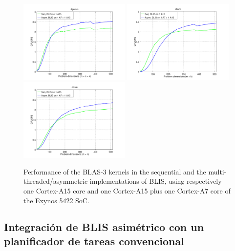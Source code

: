 \begin{figure}[t]
\centering
\includegraphics[width=0.49\textwidth]{Plots/BLIS_small/blis_dgemm_sym_asym}
\includegraphics[width=0.49\textwidth]{Plots/BLIS_small/blis_dsyrk_sym_asym}
\includegraphics[width=0.49\textwidth]{Plots/BLIS_small/blis_dtrsm_sym_asym}
\caption{Performance of the BLAS-3 kernels in the sequential and the multi-threaded/asymmetric implementations of
         BLIS, using respectively one Cortex-A15 core and one Cortex-A15 plus one Cortex-A7 core
         of the Exynos 5422 SoC.}
\label{fig:cross_blis}
\end{figure}


\subsection{Integración de BLIS asimétrico con un planificador de tareas convencional}


